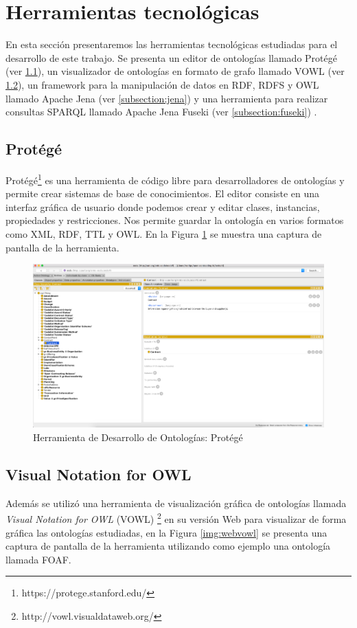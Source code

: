 \section{Herramientas tecnológicas}
En esta sección presentaremos las herramientas tecnológicas estudiadas para el desarrollo de este trabajo. Se presenta un editor de ontologías llamado Protégé (ver \ref{subsection:protege}), un visualizador de ontologías en formato de grafo llamado VOWL (ver \ref{subsection:vowl}), un framework para la manipulación de datos en RDF, RDFS y OWL llamado Apache Jena (ver \ref{subsection:jena}) y una herramienta para realizar consultas SPARQL llamado Apache Jena Fuseki (ver \ref{subsection:fuseki}) .
\subsection{Protégé}
\label{subsection:protege}
Protégé\footnote{https://protege.stanford.edu/} es una herramienta de código libre para desarrolladores de ontologías y permite crear sistemas de base de conocimientos. El editor consiste en una interfaz gráfica de usuario donde podemos crear y editar clases, instancias, propiedades y restricciones. Nos permite guardar la ontología en varios formatos como XML, RDF, TTL y OWL. En la Figura \ref{img:protege} se muestra una captura de pantalla de la herramienta.

\begin{figure}[h!]
    \centering
    \includegraphics[width=150mm]{figuras/protege}
    \caption{Herramienta de Desarrollo de Ontologías: Protégé}
    \label{img:protege}
    \end{figure}
    

\subsection{Visual Notation for OWL}
\label{subsection:vowl}
Además se utilizó una herramienta de visualización gráfica de ontologías llamada \textit{Visual Notation for OWL} (VOWL) \footnote{http://vowl.visualdataweb.org/} en su versión Web para visualizar de forma gráfica las ontologías estudiadas, en la Figura \ref{img:webvowl} se presenta una captura de pantalla de la herramienta utilizando como ejemplo una ontología llamada FOAF.

